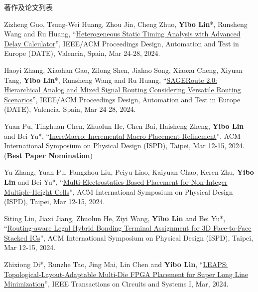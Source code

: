 \begin{rSection}{著作及论文列表}
\begin{description}[font=\normalfont, rightmargin=2em]
\item[{[C141]}]{
        Zizheng Guo, Tsung-Wei Huang, Zhou Jin, Cheng Zhuo, \textbf{Yibo Lin}*, Runsheng Wang and Ru Huang, 
    ``\href{https://ieeexplore.ieee.org/document/10546507}{Heterogeneous Static Timing Analysis with Advanced Delay Calculator}'', 
    IEEE/ACM Proceedings Design, Automation and Test in Europe (DATE), Valencia, Spain, Mar 24-28, 2024.
    
}
            

\item[{[C140]}]{
        Haoyi Zhang, Xiaohan Gao, Zilong Shen, Jiahao Song, Xiaoxu Cheng, Xiyuan Tang, \textbf{Yibo Lin}*, Runsheng Wang and Ru Huang, 
    ``\href{https://ieeexplore.ieee.org/document/10546542}{SAGERoute 2.0: Hierarchical Analog and Mixed Signal Routing Considering Versatile Routing Scenarios}'', 
    IEEE/ACM Proceedings Design, Automation and Test in Europe (DATE), Valencia, Spain, Mar 24-28, 2024.
    
}
            

\item[{[C139]}]{
        Yuan Pu, Tinghuan Chen, Zhuolun He, Chen Bai, Haisheng Zheng, \textbf{Yibo Lin} and Bei Yu*, 
    ``\href{https://doi.org/10.1145/3626184.3633321}{IncreMacro: Incremental Macro Placement Refinement}'', 
    ACM International Symposium on Physical Design (ISPD), Taipei, Mar 12-15, 2024.
    (\textbf{Best Paper Nomination})
}
            

\item[{[C138]}]{
        Yu Zhang, Yuan Pu, Fangzhou Liu, Peiyu Liao, Kaiyuan Chao, Keren Zhu, \textbf{Yibo Lin} and Bei Yu*, 
    ``\href{https://doi.org/10.1145/3626184.3633320}{Multi-Electrostatics Based Placement for Non-Integer Multiple-Height Cells}'', 
    ACM International Symposium on Physical Design (ISPD), Taipei, Mar 12-15, 2024.
    
}
            

\item[{[C137]}]{
        Siting Liu, Jiaxi Jiang, Zhuolun He, Ziyi Wang, \textbf{Yibo Lin} and Bei Yu*, 
    ``\href{https://doi.org/10.1145/3626184.3633322}{Routing-aware Legal Hybrid Bonding Terminal Assignment for 3D Face-to-Face Stacked ICs}'', 
    ACM International Symposium on Physical Design (ISPD), Taipei, Mar 12-15, 2024.
    
}
            

\item[{[J136]}]{
        Zhixiong Di*, Runzhe Tao, Jing Mai, Lin Chen and \textbf{Yibo Lin}, 
    ``\href{https://doi.org/10.1109/TCSI.2023.3340554}{LEAPS: Topological-Layout-Adaptable Multi-Die FPGA Placement for Super Long Line Minimization}'', 
    IEEE Transactions on Circuits and Systems I, Mar, 2024.
    
}
\end{description}
\end{rSection}
